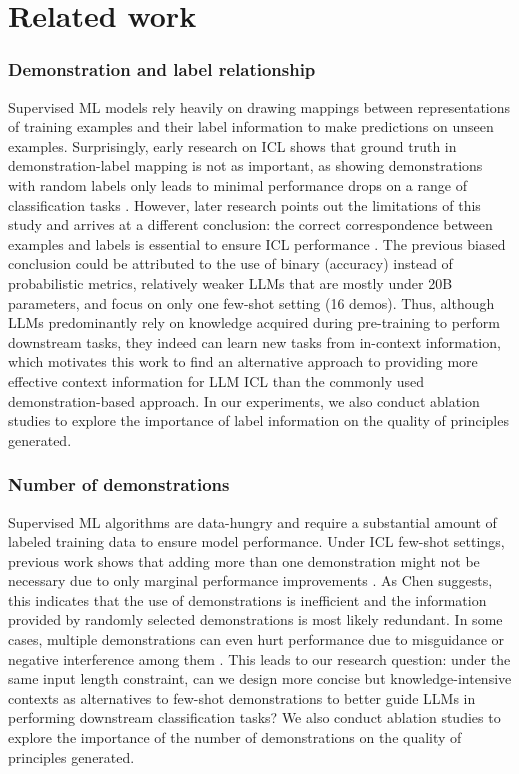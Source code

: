 \section{Related work}
\subsubsection{Demonstration and label relationship}  
Supervised ML models rely heavily on drawing mappings between representations of training examples and their label information to make predictions on unseen examples. Surprisingly, early research on ICL shows that ground truth in demonstration-label mapping is not as important, as showing demonstrations with random labels only leads to minimal performance drops on a range of classification tasks \cite{min2022rethinking}. However, later research points out the limitations of this study and arrives at a different conclusion: the correct correspondence between examples and labels is essential to ensure ICL performance \cite{kossen2023context}. The previous biased conclusion could be attributed to the use of binary (accuracy) instead of probabilistic metrics, relatively weaker LLMs that are mostly under 20B parameters, and focus on only one few-shot setting (16 demos). Thus, although LLMs predominantly rely on knowledge acquired during pre-training to perform downstream tasks, they indeed can learn new tasks from in-context information, which motivates this work to find an alternative approach to providing more effective context information for LLM ICL than the commonly used demonstration-based approach. In our experiments, we also conduct ablation studies to explore the importance of label information on the quality of principles generated.
\subsubsection{Number of demonstrations}
Supervised ML algorithms are data-hungry and require a substantial amount of labeled training data to ensure model performance. Under ICL few-shot settings, previous work shows that adding more than one demonstration might not be necessary due to only marginal performance improvements \cite{chen2023many}. As Chen suggests, this indicates that the use of demonstrations is inefficient and the information provided by randomly selected demonstrations is most likely redundant. In some cases, multiple demonstrations can even hurt performance due to misguidance or negative interference among them \cite{chen2023many}. This leads to our research question: under the same input length constraint, can we design more concise but knowledge-intensive contexts as alternatives to few-shot demonstrations to better guide LLMs in performing downstream classification tasks? We also conduct ablation studies to explore the importance of the number of demonstrations on the quality of principles generated.

